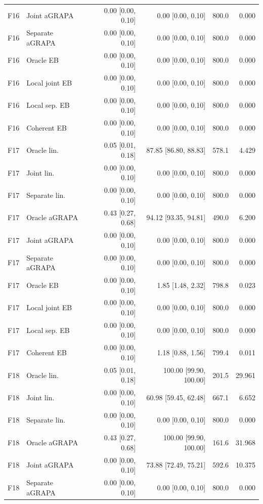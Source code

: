 \begin{longtable}{llrrrr}
F16 & Joint aGRAPA & 0.00 [0.00, 0.10] & 0.00 [0.00, 0.10] & 800.0 & 0.000\\
F16 & Separate aGRAPA & 0.00 [0.00, 0.10] & 0.00 [0.00, 0.10] & 800.0 & 0.000\\
F16 & Oracle EB & 0.00 [0.00, 0.10] & 0.00 [0.00, 0.10] & 800.0 & 0.000\\
F16 & Local joint EB & 0.00 [0.00, 0.10] & 0.00 [0.00, 0.10] & 800.0 & 0.000\\
F16 & Local sep. EB & 0.00 [0.00, 0.10] & 0.00 [0.00, 0.10] & 800.0 & 0.000\\
F16 & Coherent EB & 0.00 [0.00, 0.10] & 0.00 [0.00, 0.10] & 800.0 & 0.000\\
F17 & Oracle lin. & 0.05 [0.01, 0.18] & 87.85 [86.80, 88.83] & 578.1 & 4.429\\
F17 & Joint lin. & 0.00 [0.00, 0.10] & 0.00 [0.00, 0.10] & 800.0 & 0.000\\
F17 & Separate lin. & 0.00 [0.00, 0.10] & 0.00 [0.00, 0.10] & 800.0 & 0.000\\
F17 & Oracle aGRAPA & 0.43 [0.27, 0.68] & 94.12 [93.35, 94.81] & 490.0 & 6.200\\
F17 & Joint aGRAPA & 0.00 [0.00, 0.10] & 0.00 [0.00, 0.10] & 800.0 & 0.000\\
F17 & Separate aGRAPA & 0.00 [0.00, 0.10] & 0.00 [0.00, 0.10] & 800.0 & 0.000\\
F17 & Oracle EB & 0.00 [0.00, 0.10] & 1.85 [1.48, 2.32] & 798.8 & 0.023\\
F17 & Local joint EB & 0.00 [0.00, 0.10] & 0.00 [0.00, 0.10] & 800.0 & 0.000\\
F17 & Local sep. EB & 0.00 [0.00, 0.10] & 0.00 [0.00, 0.10] & 800.0 & 0.000\\
F17 & Coherent EB & 0.00 [0.00, 0.10] & 1.18 [0.88, 1.56] & 799.4 & 0.011\\
F18 & Oracle lin. & 0.05 [0.01, 0.18] & 100.00 [99.90, 100.00] & 201.5 & 29.961\\
F18 & Joint lin. & 0.00 [0.00, 0.10] & 60.98 [59.45, 62.48] & 667.1 & 6.652\\
F18 & Separate lin. & 0.00 [0.00, 0.10] & 0.00 [0.00, 0.10] & 800.0 & 0.000\\
F18 & Oracle aGRAPA & 0.43 [0.27, 0.68] & 100.00 [99.90, 100.00] & 161.6 & 31.968\\
F18 & Joint aGRAPA & 0.00 [0.00, 0.10] & 73.88 [72.49, 75.21] & 592.6 & 10.375\\
F18 & Separate aGRAPA & 0.00 [0.00, 0.10] & 0.00 [0.00, 0.10] & 800.0 & 0.000\\

\end{longtable}
